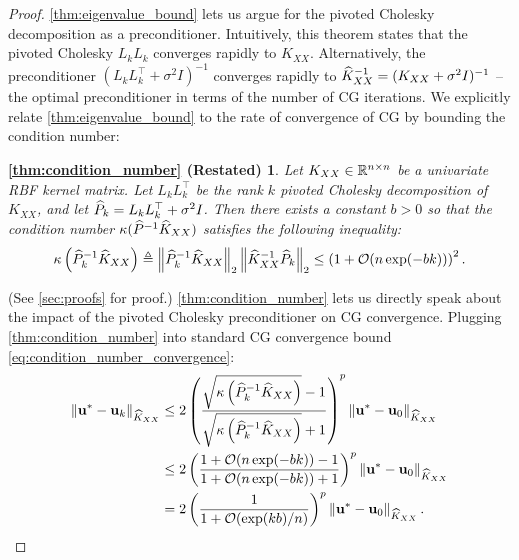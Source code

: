 \begin{proof}
\autoref{thm:eigenvalue_bound} lets us argue for the pivoted Cholesky decomposition as a preconditioner.
%
%
Intuitively, this theorem states that the pivoted Cholesky $L_k L_k$ converges rapidly to $K_{XX}$.
Alternatively, the preconditioner $(L_k L_k^\top + \sigma^2 I)^{-1}$ converges rapidly to $\widehat{K}_{XX}^{-1} = (K_{XX} + \sigma^2 I)^{-1}$ -- the optimal preconditioner in terms of the number of CG iterations.
We explicitly relate \autoref{thm:eigenvalue_bound} to the rate of convergence of CG by bounding the condition number:
%
\newtheorem*{thm:condition_number}{\autoref{thm:condition_number} (Restated)}
\begin{thm:condition_number}
  Let $K_{XX} \in \mathbb{R}^{n \times n}$ be a univariate RBF kernel matrix.
  Let $L_{k} L_k^\top$ be the rank $k$ pivoted Cholesky decomposition of $K_{XX}$, and let $\widehat{P}_{k} = L_k L_k^\top + \sigma^{2}I$.
  Then there exists a constant $b>0$ so that the condition number $\kappa(\widehat{P}^{-1}\widehat{K}_{XX})$ satisfies the following inequality:
  \begin{equation}
    \kappa \left( \trainP_{k}^{-1}\trainK \right)
    \triangleq \left\Vert \trainP_{k}^{-1}\trainK \right\Vert_{2} \left\Vert \trainK^{-1}\trainP_{k} \right\Vert_{2}
    \leq \left( 1 + \bigo{n\exp(-bk)} \right)^2.
  \end{equation}
\end{thm:condition_number}
%
(See \autoref{sec:proofs} for proof.)
\autoref{thm:condition_number} lets us directly speak about the impact of the pivoted Cholesky preconditioner on CG convergence.
Plugging \autoref{thm:condition_number} into standard CG convergence bound \eqref{eq:condition_number_convergence}:
%
\begin{align*}
  \left\Vert \bu^* - \bu_{k} \right\Vert_{\trainK}
  &\leq 2 \left( \frac{\sqrt{\kappa\left(\trainP_{k}^{-1}\trainK\right)} - 1}{\sqrt{\kappa\left(\trainP_{k}^{-1}\trainK\right)} + 1} \right)^{p} \left\Vert \bu^* - \bu_{0} \right\Vert_{\trainK}
  \\
  &\leq 2 \left( \frac{{{1 + \bigo{n\exp(-bk)}} - 1}} { {{1 + \bigo{n\exp(-bk)}} + 1}} \right)^{p} \left\Vert \bu^* - \bu_{0} \right\Vert_{\trainK}
  \\
  &= 2 \left(\frac{1}{1 + \bigo{\exp(kb) / n }}\right)^{p} \left\Vert \bu^{*} - \bu_{0} \right\Vert_{\trainK}.
\end{align*}
\end{proof}



